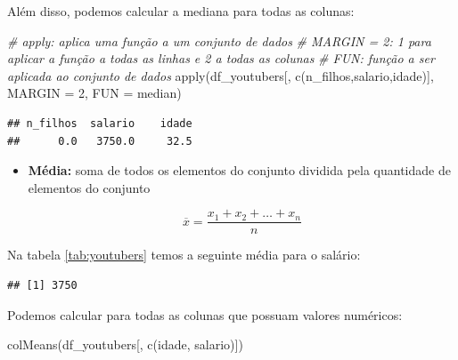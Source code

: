 \documentclass[
]{book}
\newenvironment{Shaded}{\begin{snugshade}}{\end{snugshade}}
\newcommand{\AttributeTok}[1]{\textcolor[rgb]{0.77,0.63,0.00}{#1}}
\newcommand{\CommentTok}[1]{\textcolor[rgb]{0.56,0.35,0.01}{\textit{#1}}}
\newcommand{\DecValTok}[1]{\textcolor[rgb]{0.00,0.00,0.81}{#1}}
\newcommand{\FunctionTok}[1]{\textcolor[rgb]{0.00,0.00,0.00}{#1}}
\newcommand{\NormalTok}[1]{#1}
\newcommand{\SpecialCharTok}[1]{\textcolor[rgb]{0.00,0.00,0.00}{#1}}
\newcommand{\StringTok}[1]{\textcolor[rgb]{0.31,0.60,0.02}{#1}}
\begin{document}
Além disso, podemos calcular a mediana para todas as colunas:

\begin{Shaded}
\begin{Highlighting}[]
\CommentTok{\# apply: aplica uma função a um conjunto de dados}
\CommentTok{\# MARGIN = 2: 1 para aplicar a função a todas as linhas e 2 a todas as colunas}
\CommentTok{\# FUN: função a ser aplicada ao conjunto de dados}
\FunctionTok{apply}\NormalTok{(df\_youtubers[, }\FunctionTok{c}\NormalTok{(}\StringTok{\textquotesingle{}n\_filhos\textquotesingle{}}\NormalTok{,}\StringTok{\textquotesingle{}salario\textquotesingle{}}\NormalTok{,}\StringTok{\textquotesingle{}idade\textquotesingle{}}\NormalTok{)], }\AttributeTok{MARGIN =} \DecValTok{2}\NormalTok{, }\AttributeTok{FUN =}\NormalTok{ median)}
\end{Highlighting}
\end{Shaded}

\begin{verbatim}
## n_filhos  salario    idade 
##      0.0   3750.0     32.5
\end{verbatim}

\begin{itemize}
\item
  \textbf{Média:} soma de todos os elementos do conjunto dividida pela quantidade de elementos do conjunto

  \[
  \overline{x} = \frac{x_1+x_2 + \dots + x_n}{n}
  \]
\end{itemize}

Na tabela \ref{tab:youtubers} temos a seguinte média para o salário:

\begin{Shaded}
\end{Shaded}

\begin{verbatim}
## [1] 3750
\end{verbatim}

Podemos calcular para todas as colunas que possuam valores numéricos:

\begin{Shaded}
\begin{Highlighting}[]
\FunctionTok{colMeans}\NormalTok{(df\_youtubers[, }\FunctionTok{c}\NormalTok{(}\StringTok{\textquotesingle{}idade\textquotesingle{}}\NormalTok{, }\StringTok{\textquotesingle{}salario\textquotesingle{}}\NormalTok{)])}
\end{Highlighting}
\end{Shaded}
\end{document}
